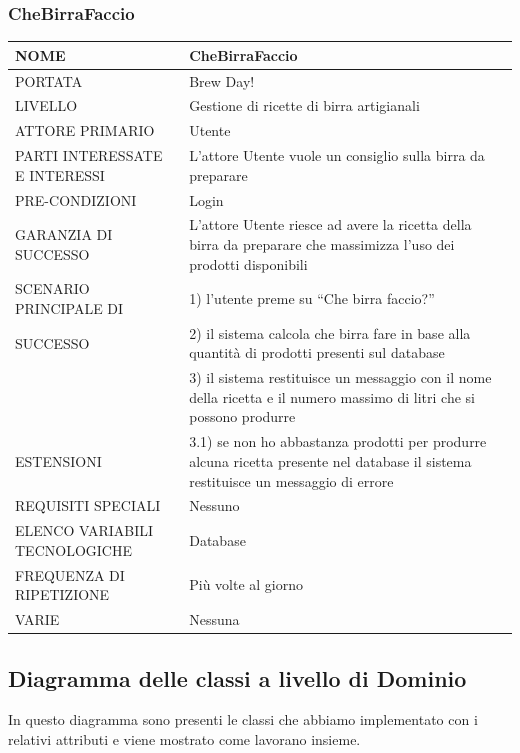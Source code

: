 \documentclass[a4paper, titlepage]{article}
\begin{document}
\subsubsection{CheBirraFaccio}
\begin{longtable}{p{6cm}p{7cm}}\toprule
    NOME & CheBirraFaccio\\\midrule
    PORTATA & Brew Day!\\\midrule
    LIVELLO & Gestione di ricette di birra artigianali\\\midrule
    ATTORE PRIMARIO & Utente\\\midrule
    PARTI INTERESSATE E INTERESSI &
    L’attore Utente vuole un consiglio sulla birra da preparare\\\midrule
    PRE-CONDIZIONI & Login\\\midrule
    GARANZIA DI SUCCESSO &L’attore Utente riesce ad avere la ricetta della birra da preparare che massimizza l’uso dei prodotti disponibili\\\midrule
    SCENARIO PRINCIPALE DI
    & 1) l’utente preme su “Che birra faccio?”\\
    SUCCESSO & 2) il sistema calcola che birra fare in base alla quantità di prodotti presenti sul database\\
    & 3) il sistema restituisce un messaggio con il nome della ricetta e il numero massimo di litri che si possono produrre\\
    ESTENSIONI
    & 3.1) se non ho abbastanza prodotti per produrre alcuna ricetta presente nel database il sistema restituisce un messaggio di errore\\\midrule
    REQUISITI SPECIALI & Nessuno\\\midrule
    ELENCO VARIABILI TECNOLOGICHE & Database\\\midrule
    FREQUENZA DI RIPETIZIONE & Più volte al giorno\\\midrule
    VARIE & Nessuna \\\bottomrule
\end{longtable}

\newpage
\subsection{Diagramma delle classi a livello di Dominio}
In questo diagramma sono presenti le classi che abbiamo implementato con i relativi attributi e viene mostrato come lavorano insieme.
\end{document}
